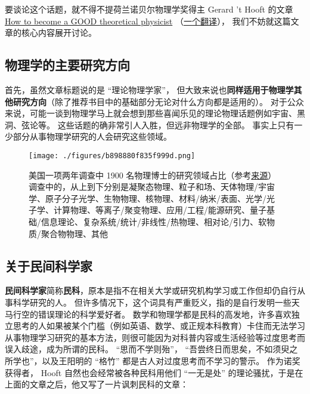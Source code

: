 
\begin{issues}
\issueDraft
\end{issues}

要谈论这个话题，就不得不提荷兰诺贝尔物理学奖得主 Gerard 't Hooft 的文章 \href{https://webspace.science.uu.nl/~hooft101/theorist.html}{How to become a GOOD theoretical physicist} （\href{https://xialab.pku.edu.cn/kytdyw1/zdylm.m.jsp?wbtreeid=1011&tstreeid=11956&_t_uid=2945&language=en&homepageuuid=BF649325C5584FC683CE0B601D21AC65&templateuuid=4CC182410BA14FF8B55ED726FB2087FB&producttype=0&_tmode_=99&tsitesapptype=zdylm}{一个翻译}）， 我们不妨就这篇文章的核心内容展开讨论。

\subsection{物理学的主要研究方向}
首先，虽然文章标题说的是 “理论物理学家”， 但大致来说也\textbf{同样适用于物理学其他研究方向}（除了推荐书目中的基础部分无论对什么方向都是适用的）。 对于公众来说，可能一谈到物理学马上就会想到那些喜闻乐见的理论物理话题例如宇宙、黑洞、弦论等。 这些话题的确非常引人入胜，但远非物理学的全部。 事实上只有一少部分从事物理学研究的人会研究这些领域。

\begin{figure}[ht]
\centering
\texttt{[image: ./figures/b898880f835f999d.png]}
\caption{美国一项两年调查中 1900 名物理博士的研究领域占比（参考\href{https://ww2.aip.org/statistics/trends-in-physics-phds}{来源}）调查中的，从上到下分别是凝聚态物理、粒子和场、天体物理/宇宙学、原子分子光学、生物物理、核物理、材料/纳米/表面、光学/光子学、计算物理、等离子/聚变物理、应用/工程/能源研究、量子基础/信息理论、复杂系统/统计/非线性/热物理、相对论/引力、软物质/聚合物物理、其他} \label{fig_SdyPhy_1}
\end{figure}

\subsection{关于民间科学家}
\textbf{民间科学家}简称\textbf{民科}，原本是指不在相关大学或研究机构学习或工作但却仍自行从事科学研究的人。 但许多情况下，这个词具有严重贬义，指的是自行发明一些天马行空的错误理论的科学爱好者。 数学和物理学都是民科的高发地，许多喜欢独立思考的人如果被某个门槛（例如英语、数学、或正规本科教育）卡住而无法学习从事物理学习研究的基本方法，则很可能因为对科普内容或生活经验等过度思考而误入歧途，成为所谓的民科。 “思而不学则殆”， “吾尝终日而思矣，不如须臾之所学也”，以及王阳明的 “格竹” 都是古人对过度思考而不学习的警示。 作为诺奖获得者， Hooft 自然也会经常被各种民科用他们 “一无是处” 的理论骚扰，于是在上面的文章之后，他又写了一片讽刺民科的文章：

